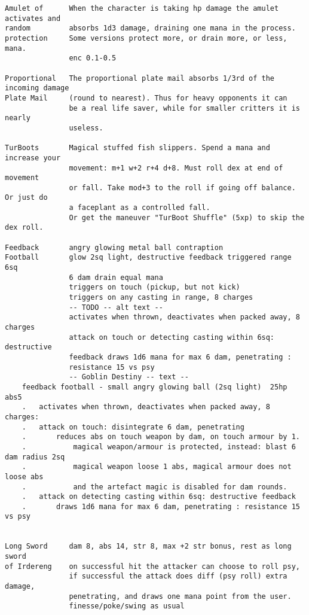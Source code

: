 \begin{verbatim}
Amulet of      When the character is taking hp damage the amulet activates and
random         absorbs 1d3 damage, draining one mana in the process.
protection     Some versions protect more, or drain more, or less, mana.
               enc 0.1-0.5

Proportional   The proportional plate mail absorbs 1/3rd of the incoming damage
Plate Mail     (round to nearest). Thus for heavy opponents it can
               be a real life saver, while for smaller critters it is nearly
               useless.

TurBoots       Magical stuffed fish slippers. Spend a mana and increase your
               movement: m+1 w+2 r+4 d+8. Must roll dex at end of movement 
               or fall. Take mod+3 to the roll if going off balance. Or just do 
               a faceplant as a controlled fall.
               Or get the maneuver "TurBoot Shuffle" (5xp) to skip the dex roll.

Feedback       angry glowing metal ball contraption
Football       glow 2sq light, destructive feedback triggered range 6sq
               6 dam drain equal mana
               triggers on touch (pickup, but not kick)
               triggers on any casting in range, 8 charges
               -- TODO -- alt text --
               activates when thrown, deactivates when packed away, 8 charges
               attack on touch or detecting casting within 6sq: destructive 
               feedback draws 1d6 mana for max 6 dam, penetrating : 
               resistance 15 vs psy
               -- Goblin Destiny -- text --
    feedback football - small angry glowing ball (2sq light)  25hp abs5
    .   activates when thrown, deactivates when packed away, 8 charges:
    .   attack on touch: disintegrate 6 dam, penetrating
    .       reduces abs on touch weapon by dam, on touch armour by 1.
    .           magical weapon/armour is protected, instead: blast 6 dam radius 2sq
    .           magical weapon loose 1 abs, magical armour does not loose abs
    .           and the artefact magic is disabled for dam rounds.
    .   attack on detecting casting within 6sq: destructive feedback
    .       draws 1d6 mana for max 6 dam, penetrating : resistance 15 vs psy


Long Sword     dam 8, abs 14, str 8, max +2 str bonus, rest as long sword
of Irdereng    on successful hit the attacker can choose to roll psy,
               if successful the attack does diff (psy roll) extra damage,
               penetrating, and draws one mana point from the user.
               finesse/poke/swing as usual


\end{verbatim}
